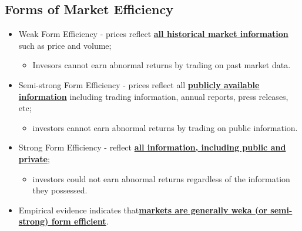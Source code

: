 \documentclass[11pt,a4paper]{report}
\begin{document}
\subsection{Forms of Market Efficiency}
\begin{itemize}
    \item Weak Form Efficiency - prices reflect \textbf{\underline{all historical market information}} such as price and volume;
    \begin{itemize}
        \item Invesors cannot earn abnormal returns by trading on past market data.
    \end{itemize}
    \item Semi-strong Form Efficiency - prices reflect all \textbf{\underline{publicly available information}} including trading information, annual reports, press releases, etc;
    \begin{itemize}
        \item investors cannot earn abnormal returns by trading on public information.
    \end{itemize}
    \item Strong Form Efficiency - reflect \textbf{\underline{all information, including public and private}};
    \begin{itemize}
        \item investors could not earn abnormal returns regardless of the information they possessed.
    \end{itemize}
    \item Empirical evidence indicates that\textbf{\underline{markets are generally weka (or semi-strong) form efficient}}.
\end{itemize}
\end{document}
